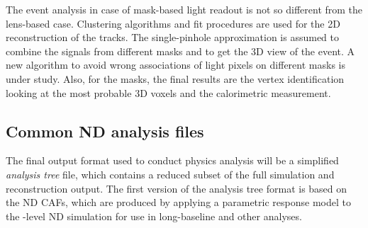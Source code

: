 \documentclass[../main-v1.tex]{subfiles}
\begin{document}
The event analysis in case of mask-based light readout is not so different from the lens-based case. Clustering algorithms and fit procedures are used for the 2D reconstruction of the tracks. The single-pinhole approximation is assumed to combine the signals from different masks and to get the 3D view of the event. A new algorithm to avoid wrong associations of light pixels on different masks is under study. Also, for the masks, the final results are the vertex identification looking at the most probable 3D voxels and the calorimetric measurement.
 

\subsection{Common ND analysis files}

The final output format used to conduct physics analysis will be a simplified
{\it analysis tree} file, which contains a reduced subset of the full simulation
and reconstruction output. The first version of the analysis tree format is
based on the ND CAFs, which are produced by applying a parametric response
model to the -level ND simulation for use in long-baseline and other analyses.
\end{document}
